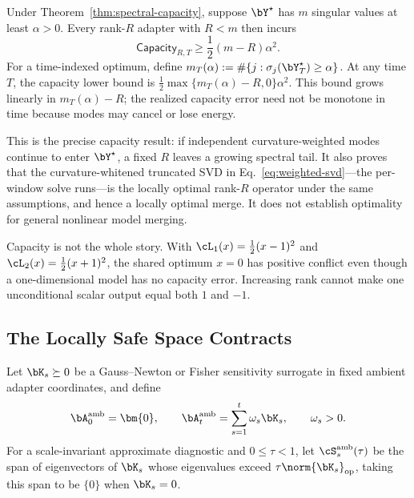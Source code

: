 \begin{corollary}
\label{cor:capacity-lower-bound}
Under Theorem~\ref{thm:spectral-capacity}, suppose $\bY^\star$ has $m$
singular values at least $\alpha>0$. Every rank-$R$ adapter with $R<m$ then
incurs
\begin{equation}
  \mathsf{Capacity}_{R,T}\geq\frac12(m-R)\alpha^2.
  \label{eq:capacity-lower-bound}
\end{equation}
For a time-indexed optimum, define
$m_T(\alpha):=\#\{j:\sigma_j(\bY_T^\star)\geq\alpha\}$. At any time $T$, the
capacity lower bound is
$\frac12\max\{m_T(\alpha)-R,0\}\alpha^2$. This bound grows
linearly in $m_T(\alpha)-R$; the realized capacity error need not be monotone
in time because modes may cancel or lose energy.
\end{corollary}

This is the precise capacity result: if independent curvature-weighted modes
continue to enter $\bY^\star$, a fixed $R$ leaves a growing spectral tail. It
also proves that the curvature-whitened truncated SVD in
Eq.~\eqref{eq:weighted-svd}---the per-window solve \method{} runs---is the
locally optimal rank-$R$ operator under the same assumptions, and hence a locally
optimal merge. It does not establish optimality for general nonlinear model
merging.

Capacity is not the whole story. With
$\cL_1(x)=\frac12(x-1)^2$ and
$\cL_2(x)=\frac12(x+1)^2$, the shared optimum $x=0$ has positive conflict even
though a one-dimensional model has no capacity error. Increasing rank cannot
make one unconditional scalar output equal both $1$ and $-1$.

\subsection{The Locally Safe Space Contracts}

Let $\bK_s\succeq0$ be a Gauss--Newton or Fisher sensitivity surrogate in
fixed ambient adapter coordinates, and define
\begin{equation}
  \bA_0^{\mathrm{amb}}=\bm{0},
  \qquad
  \bA_t^{\mathrm{amb}}=\sum_{s=1}^{t}\omega_s\bK_s,
  \qquad \omega_s>0.
  \label{eq:additive-safe-curvature}
\end{equation}
For a scale-invariant approximate diagnostic and $0\leq\tau<1$, let
$\cS_s^{\mathrm{amb}}(\tau)$ be the span of eigenvectors of $\bK_s$ whose
eigenvalues exceed $\tau\norm{\bK_s}_{\mathrm{op}}$, taking this span to be
$\{0\}$ when $\bK_s=0$.

